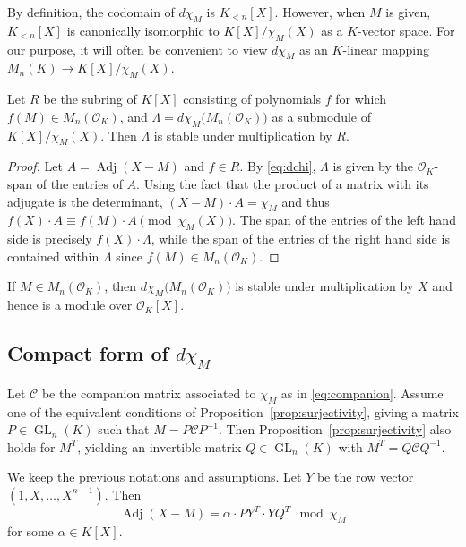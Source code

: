 \documentclass{sig-alternate-05-2015}
\DeclareMathOperator{\GL}{GL}
\DeclareMathOperator{\adj}{Adj}
\newcommand{\OK}{\mathcal{O}_K}
\begin{document}
By definition, the codomain of $d \chi_M$ is $K_{< n}[X]$. 
However, when $M$ is given, $K_{< n}[X]$ is canonically isomorphic
to $K[X]/\chi_M(X)$ as a $K$-vector space. For our purpose, it will 
often be convenient to view $d \chi_M$ as an $K$-linear mapping
$M_n(K) \to K[X]/\chi_M(X)$.

\begin{prop}
Let $R$ be the subring of $K[X]$ consisting of polynomials $f$ for
which $f(M) \in M_n(\OK)$, and $\Lambda = d \chi_M \big(M_n(\OK)\big)$
as a submodule of $K[X]/\chi_M(X)$.  Then $\Lambda$ is stable under 
multiplication by $R$.
\end{prop}
\begin{proof}
Let $A = \adj(X-M)$ and $f \in R$.  By \eqref{eq:dchi}, $\Lambda$ is given by
the $\OK$-span of the entries of $A$.   Using the fact that the product of a matrix
with its adjugate is the determinant, $(X - M) \cdot A = \chi_M$ and thus
$f(X) \cdot A \equiv f(M) \cdot A \pmod{\chi_M(X)}$.  The span of the entries
of the left hand side is precisely $f(X) \cdot \Lambda$, while the span of the entries
of the right hand side is contained within $\Lambda$ since $f(M) \in M_n(\OK)$.
\end{proof}

\begin{cor}
If $M \in M_n(\OK)$, then $d \chi_M \big(M_n(\OK)\big)$ 
is stable under multiplication by $X$ and hence is a module over $\OK[X]$.
\end{cor}

\subsection{Compact form of $d \chi_M$}

Let $\mathscr{C}$ be the companion matrix associated to $\chi_M$ as in \eqref{eq:companion}.
Assume one of the equivalent conditions of Proposition~\ref{prop:surjectivity}, giving a matrix 
$P \in \GL_n(K)$ such that $M = P \mathscr{C} P^{-1}$. Then Proposition~\ref{prop:surjectivity}
also holds for $M^T$, yielding an
invertible matrix $Q \in \GL_n(K)$ with $M^T = Q \mathscr{C} Q^{-1}$.

\begin{prop}
\label{prop:shortcom}
We keep the previous notations and assumptions.
Let $Y$ be the row vector $(1, X, \ldots, X^{n-1})$. Then
\begin{equation}
\label{eq:shortcom}
\adj(X{-}M) = \alpha \cdot P Y^T \cdot Y Q^T
\mod \chi_M
\end{equation}
for some $\alpha \in K[X]$.
\end{prop}
\end{document}
